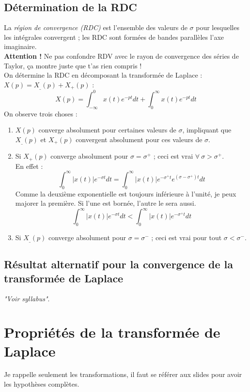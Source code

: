 	\subsection{Détermination de la RDC}
	La \textit{région de convergence (RDC)} est l'ensemble des valeurs de $\sigma$ 
	pour lesquelles les intégrales convergent ; les RDC sont formées de bandes 
	parallèles  l'axe imaginaire.\\
	\textbf{Attention !} Ne pas confondre RDV avec le rayon de convergence des 
	séries de Taylor, ça montre juste que t'as rien compris !\\
	On détermine la RDC en décomposant la transformée de Laplace : $X(p) = X_\_(p)+
	X_+(p)$ :
	\begin{equation}
	X(p) = \int_{-\infty}^0 x(t)e^{-pt}dt + \int_0^\infty x(t)e^{-pt}dt
	\end{equation}
	On observe trois choses :
	\begin{enumerate}
	\item $X(p)$ converge absolument pour certaines valeurs de $\sigma$, impliquant 
	que $X_\_(p)$ et  $X_+(p)$ convergent absolument pour ces valeurs de $\sigma$.
	\item Si $X_+(p)$ converge absolument pour $\sigma=\sigma^+$ ; ceci est vrai
	$\forall\ \sigma>\sigma^+$.\\
	En effet : 
	\begin{equation}
	\int_0^\infty |x(t)|e^{-\sigma t}dt = \int_0^\infty |x(t)|e^{-\sigma^+t}e^{
	(\sigma-\sigma^+)t} dt
	\end{equation}
	Comme la deuxième exponentielle est toujours inférieure à l'unité, je peux 
	majorer la première. Si l'une est bornée, l'autre le sera aussi.
	\begin{equation}
	\int_0^\infty |x(t)|e^{-\sigma t}dt < \int_0^\infty |x(t)|e^{-\sigma^+t}dt
	\end{equation}
	\item Si $X_\_(p)$ converge absolument pour $\sigma = \sigma^-$ ; ceci est 
	vrai pour tout $\sigma < \sigma^-$.
	\end{enumerate}


	\subsection{Résultat alternatif pour la convergence de la transformée de Laplace}
	\textit{"Voir syllabus"}.


\section{Propriétés de la transformée de Laplace}
Je rappelle seulement les transformations, il faut se référer aux slides pour avoir
les hypothèses complètes.
